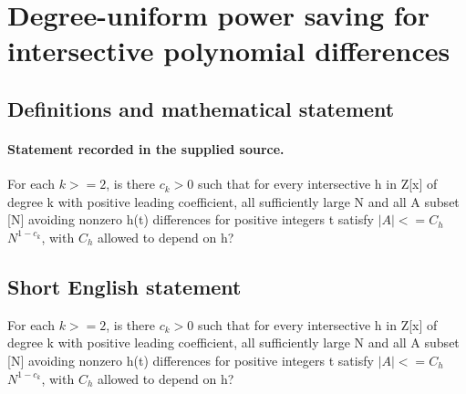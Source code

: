 \documentclass[11pt]{article}
\begin{document}
\section*{Degree-uniform power saving for intersective polynomial differences}\label{statement}
\subsection{Definitions and mathematical statement}
\paragraph{Statement recorded in the supplied source.}
For each $k>=2$, is there $c_k>0$ such that for every intersective h in Z[x] of degree k with positive leading coefficient, all sufficiently large N and all A subset [N] avoiding nonzero h(t) differences for positive integers t satisfy $|A|<=C_h$ $N^{1-c_k}$, with $C_h$ allowed to depend on h?
\subsection{Short English statement}
For each $k>=2$, is there $c_k>0$ such that for every intersective h in Z[x] of degree k with positive leading coefficient, all sufficiently large N and all A subset [N] avoiding nonzero h(t) differences for positive integers t satisfy $|A|<=C_h$ $N^{1-c_k}$, with $C_h$ allowed to depend on h?
\end{document}
